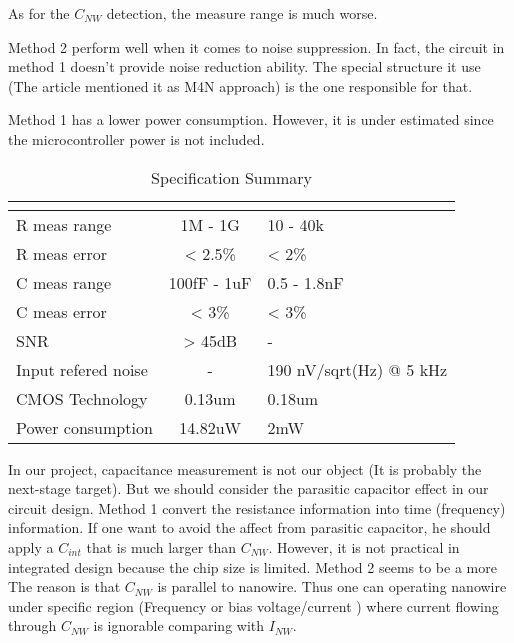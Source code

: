 As for the $C_{NW}$ detection,
the measure range is much worse.{\color{red}{Reason}}

Method 2 perform well when it comes to noise suppression.
In fact, the circuit in method 1 doesn't provide noise reduction ability.
The special structure it use (The article \cite{Juv1} mentioned it as M4N approach) is the one responsible for that.

Method 1 has a lower power consumption. However, it is under estimated since the microcontroller power is not included.

\begin{table}[!b]
    {\fontfamily{}\fontsize{10}{14}\selectfont
    \centering
    \label{tb:LVtable}
    \begin{tabular}{l|cp{4cm}}
        & \cite{Juv2} & \cite{Jlockin}\\
        \hline
        R meas range & 1M - 1G & 10 - 40k\\
        \hline
        R meas error & < 2.5\% & < 2\%\\
        \hline
        C meas range & 100fF - 1uF & 0.5 - 1.8nF\\
        \hline
        C meas error & < 3\% & < 3\%\\
        \hline
        SNR & > 45dB & - \\
        \hline
        Input refered noise & - & 190 nV/sqrt(Hz) @ 5 kHz \\
        \hline
        CMOS Technology & 0.13um & 0.18um\\
        \hline
        Power consumption & 14.82uW & 2mW\\
    \end{tabular}
    \caption{Specification Summary}
    }
\end{table}

In our project, capacitance measurement is not our object (It is probably the next-stage target).
But we should consider the parasitic capacitor effect in our circuit design.
Method 1 convert the resistance information into time (frequency) information.
If one want to avoid the affect from parasitic capacitor, he should apply a $C_{int}$ that is much larger than $C_{NW}$.
However, it is not practical in integrated design because the chip size is limited.
Method 2 seems to be a more
The reason is that $C_{NW}$ is parallel to nanowire.
Thus one can operating nanowire under specific region (Frequency or bias voltage/current ) where current flowing through $C_{NW}$ is ignorable comparing with $I_{NW}$.









%
